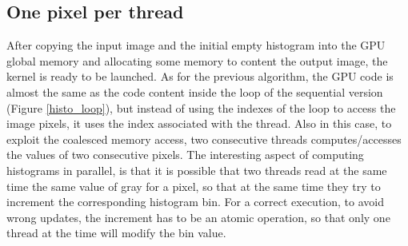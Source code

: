 \documentclass[a4paper]{article}
\begin{document}
\subsection{One pixel per thread}
\label{sec:fm2}
After copying the input image and the initial empty histogram into the GPU global memory and allocating some memory to content the output image, the kernel is ready to be launched. As for the previous algorithm, the GPU code is almost the same as the code content inside the loop of the sequential version (Figure \ref{histo_loop}), but instead of using the indexes of the loop to access the image pixels, it uses the index associated with the thread. Also in this case, to exploit the coalesced memory access, two consecutive threads computes/accesses the values of two consecutive pixels. The interesting aspect of computing histograms in parallel, is that it is possible that two threads read at the same time the same value of gray for a pixel, so that at the same time they try to increment the corresponding histogram bin. For a correct execution, to avoid wrong updates, the increment has to be an atomic operation, so that only one thread at the time will modify the bin value. 
\end{document}
